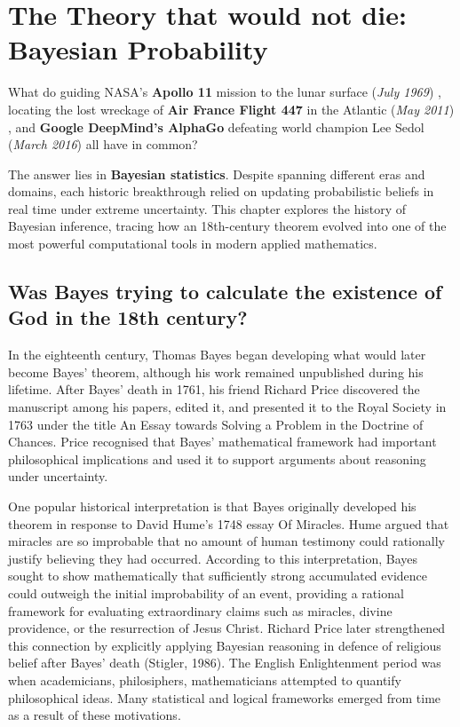 
\section{The Theory that would not die: Bayesian Probability}


\noindent
What do guiding NASA's \textbf{Apollo 11} mission to the lunar surface (\textit{July 1969}) \cite{schmidt1966application}, locating the lost wreckage of \textbf{Air France Flight 447} in the Atlantic (\textit{May 2011}) \cite{stone2014search, cornell2015bayes}, and \textbf{Google DeepMind's AlphaGo} defeating world champion Lee Sedol (\textit{March 2016}) \cite{silver2016mastering} all have in common? 

The answer lies in \textbf{Bayesian statistics}. Despite spanning different eras and domains, each historic breakthrough relied on updating probabilistic beliefs in real time under extreme uncertainty. This chapter explores the history of Bayesian inference, tracing how an 18th-century theorem evolved into one of the most powerful computational tools in modern applied mathematics.


\subsection{Was Bayes trying to calculate the existence of God in the 18th century?}
In the eighteenth century, Thomas Bayes began developing what would later become Bayes' theorem, although his work remained unpublished during his lifetime. After Bayes' death in 1761, his friend Richard Price discovered the manuscript among his papers, edited it, and presented it to the Royal Society in 1763 under the title An Essay towards Solving a Problem in the Doctrine of Chances. Price recognised that Bayes' mathematical framework had important philosophical implications and used it to support arguments about reasoning under uncertainty.


One popular historical interpretation is that Bayes originally developed his theorem in response to David Hume's 1748 essay Of Miracles. Hume argued that miracles are so improbable that no amount of human testimony could rationally justify believing they had occurred. According to this interpretation, Bayes sought to show mathematically that sufficiently strong accumulated evidence could outweigh the initial improbability of an event, providing a rational framework for evaluating extraordinary claims such as miracles, divine providence, or the resurrection of Jesus Christ. Richard Price later strengthened this connection by explicitly applying Bayesian reasoning in defence of religious belief after Bayes' death (Stigler, 1986).
The English Enlightenment period was when academicians, philosiphers, mathematicians attempted to quantify philosophical ideas. Many statistical and logical frameworks emerged from time as a result of these motivations. 

